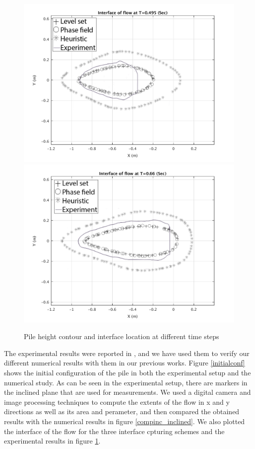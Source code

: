 \documentclass[letterpaper,10pt]{article}
\begin{document}
\begin{figure}[H]
\begin{minipage}[b]{.5 \linewidth}
                \includegraphics[width=1\textwidth]{IMAGES/interface495.png}
                \includegraphics[width=1\textwidth]{IMAGES/interface660.png}
        \end{minipage}
        \caption{Pile height contour and interface location at different time steps}
        \label{Pile_height_contour}
\end{figure}
The experimental results were reported in \cite{AmyWebb2004}, and we have used them to verify our different numerical results with them in our previous works. Figure \ref{initialconf} shows the initial configuration of the pile in both the experimental setup and the numerical study. As can be seen in the experimental setup, there are markers in the inclined plane that are used for measurements. We used a digital camera and image processing techniques to compute the extents of the flow in x and y directions as well as its area and perameter, and then compared the obtained results with the numerical results in figure \ref{compinc_inclined}. We also plotted the interface of the flow for the three interface cpturing schemes and the experimental results in figure \ref{Pile_height_contour}.
\end{document}
